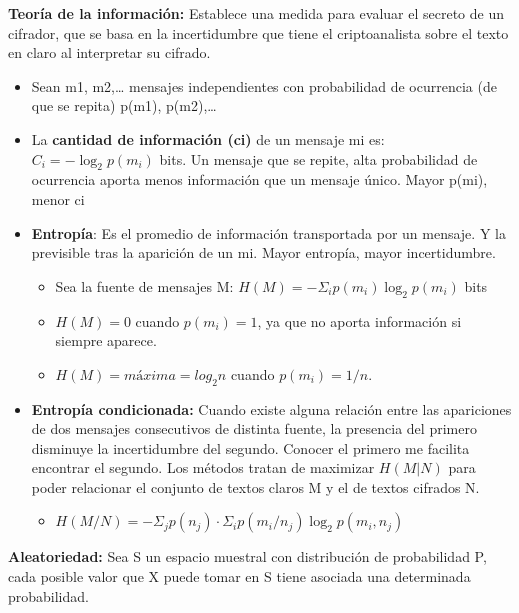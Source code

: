 \documentclass[12pt, twoside, openright]{report} %
\begin{document}
  
  \textbf{Teoría de la información:} Establece una medida para evaluar
  el secreto de un cifrador, que se basa en la incertidumbre que tiene
  el criptoanalista sobre el texto en claro al interpretar su cifrado.
  

  \begin{itemize}
  \item Sean m1, m2,\ldots{} mensajes independientes con probabilidad de
    ocurrencia (de que se repita) p(m1), p(m2),\ldots{}
    
  \item La \textbf{cantidad de información (ci)} de un mensaje mi es: $C_i=-\log_2 p(m_i)$ bits. Un
    mensaje que se repite, alta probabilidad de ocurrencia aporta menos
    información que un mensaje único. Mayor p(mi), menor ci
    
  \item \textbf{Entropía}: Es el promedio de información transportada por un
    mensaje. Y la previsible tras la aparición de un mi. Mayor entropía,
    mayor incertidumbre.
    
    \begin{itemize}
    \item Sea la fuente de mensajes M: $H(M)=-\Sigma_i p(m_i) \log_2 p(m_i)$ bits
      
    \item $H(M)=0$ cuando $p(m_i)=1$, ya que no aporta información si siempre
      aparece.
      
    \item $H(M)=máxima=log_2 n$ cuando $p(m_i)=1/n$.
      
    \end{itemize}
  \item \textbf{Entropía condicionada:} Cuando existe alguna relación entre
    las apariciones de dos mensajes consecutivos de distinta fuente, la
    presencia del primero disminuye la incertidumbre del segundo.
    Conocer el primero me facilita encontrar el segundo. Los métodos
    tratan de maximizar $H(M| N)$ para poder relacionar el conjunto
    de textos claros M y el de textos cifrados N.
 
    \begin{itemize}
    \item $H(M/N) =-\Sigma_j p(n_j)\cdot \Sigma_i p(m_i/n_j) \log_2 p(m_i, n_j)$
      
    \end{itemize}
  \end{itemize}

  
  \textbf{Aleatoriedad:} Sea S un espacio muestral con distribución de
  probabilidad P, cada posible valor que X puede tomar en S tiene
  asociada una determinada probabilidad.
  
\end{document}
